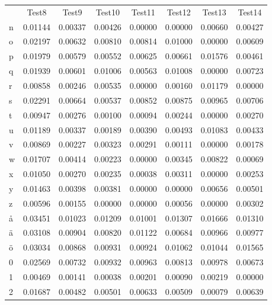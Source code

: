 \begin{tabularx}{\textwidth}{X|c|c|c|c|c|c|c}
 & Test8 & Test9 & Test10 & Test11 & Test12 & Test13 & Test14 \\%
n   & 0.01144 &  0.00337 &  0.00426 &  0.00000 &  0.00000 &  0.00660 &  0.00427 \\
o   & 0.02197 &  0.00632 &  0.00810 &  0.00814 &  0.01000 &  0.00000 &  0.00609 \\
p   & 0.01979 &  0.00579 &  0.00552 &  0.00625 &  0.00661 &  0.01576 &  0.00461 \\
q   & 0.01939 &  0.00601 &  0.01006 &  0.00563 &  0.01008 &  0.00000 &  0.00723 \\
r   & 0.00858 &  0.00246 &  0.00535 &  0.00000 &  0.00160 &  0.01179 &  0.00000 \\
s   & 0.02291 &  0.00664 &  0.00537 &  0.00852 &  0.00875 &  0.00965 &  0.00706 \\
t   & 0.00947 &  0.00276 &  0.00100 &  0.00094 &  0.00244 &  0.00000 &  0.00270 \\
u   & 0.01189 &  0.00337 &  0.00189 &  0.00390 &  0.00493 &  0.01083 &  0.00433 \\
v   & 0.00869 &  0.00227 &  0.00323 &  0.00291 &  0.00111 &  0.00000 &  0.00178 \\
w   & 0.01707 &  0.00414 &  0.00223 &  0.00000 &  0.00345 &  0.00822 &  0.00069 \\
x   & 0.01050 &  0.00270 &  0.00235 &  0.00038 &  0.00311 &  0.00000 &  0.00253 \\
y   & 0.01463 &  0.00398 &  0.00381 &  0.00000 &  0.00000 &  0.00656 &  0.00501 \\
z   & 0.00596 &  0.00155 &  0.00000 &  0.00000 &  0.00056 &  0.00000 &  0.00302 \\
å   & 0.03451 &  0.01023 &  0.01209 &  0.01001 &  0.01307 &  0.01666 &  0.01310 \\
ä   & 0.03108 &  0.00904 &  0.00820 &  0.01122 &  0.00684 &  0.00966 &  0.00977 \\
ö   & 0.03034 &  0.00868 &  0.00931 &  0.00924 &  0.01062 &  0.01044 &  0.01565 \\
0   & 0.02569 &  0.00732 &  0.00932 &  0.00963 &  0.00813 &  0.00978 &  0.00673 \\
1   & 0.00469 &  0.00141 &  0.00038 &  0.00201 &  0.00090 &  0.00219 &  0.00000 \\
2   & 0.01687 &  0.00482 &  0.00501 &  0.00633 &  0.00509 &  0.00079 &  0.00639 \\

\end{tabularx}

